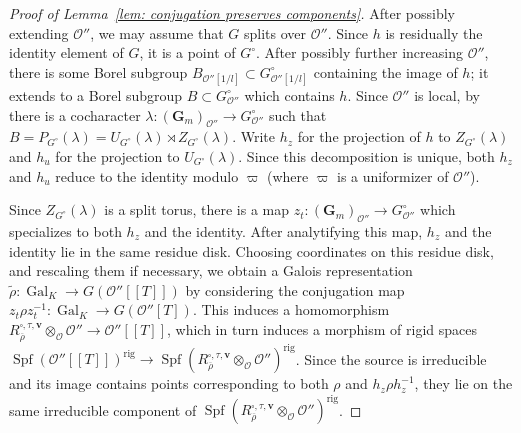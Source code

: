 \documentclass{amsart}
\renewcommand{\mathbb}{\mathbf}
\theoremstyle{definition}
\theoremstyle{remark}
\newcommand{\mar}[1]{}
\newcommand{\mar}[1]{\marginpar{\raggedright\tiny squirrel #1}}
\newcommand{\GG}{{\mathbb G}}
\newcommand{\cO}{{\mathcal O}}
\DeclareMathOperator{\Gal}{Gal}
\DeclareMathOperator{\Spf}{Spf}
\newcommand{\rhobar}{\overline{\rho}}
\newcommand{\Gm}{\GG_m}
\begin{document}
\begin{proof}[Proof of Lemma~\ref{lem: conjugation preserves components}]
After possibly extending $\cO''$, we may assume that $G$ splits over $\cO''$.  Since $h$ is residually the identity element of $G$, it is a point of $G^\circ$.  After possibly further increasing $\cO''$, there is some Borel subgroup $B_{\cO''[1/l]}\subset G_{\cO''[1/l]}^\circ$ containing the image of $h$; it extends to a Borel subgroup $B\subset G_{\cO''}^\circ$ which contains $h$.  Since $\cO''$ is local, by~\cite[Proposition 5.2.3]{conrad-luminy} there is a cocharacter $\lambda:(\Gm)_{\cO''}\rightarrow G_{\cO''}^\circ$ such that $B=P_{G^\circ}(\lambda)=U_{G^\circ}(\lambda)\rtimes Z_{G^\circ}(\lambda)$.  Write $h_z$ for the projection of $h$ to $Z_{G^\circ}(\lambda)$ and $h_u$ for the projection to $U_{G^\circ}(\lambda)$.  Since this decomposition is unique, both $h_z$ and $h_u$ reduce to the identity modulo $\varpi$ (where $\varpi$ is a uniformizer of $\cO''$).  

Since $Z_{G^\circ}(\lambda)$ is a split torus, %
there is a map
$z_t:(\Gm)_{\cO''}\rightarrow G_{\cO''}^\circ$ which specializes to both
$h_z$ and the identity.  After analytifying this map, $h_z$ and the
identity lie in the same residue disk.  Choosing coordinates on this
residue disk, and rescaling them if necessary,
we obtain a Galois representation $\widetilde\rho:\Gal_K\rightarrow G(\cO''[\![T]\!])$ by considering the conjugation map $z_t\rho z_t^{-1}:\Gal_K\rightarrow G(\cO''[T])$.  This induces a homomorphism $R_{\rhobar}^{\square,\tau,\mathbf{v}}\otimes_{\cO}\cO''\rightarrow \cO''[\![T]\!]$, which in turn induces a morphism of rigid spaces $\Spf(\cO''[\![T]\!])^{\mathrm{rig}}\rightarrow \Spf (R_{\rhobar}^{\square,\tau,\mathbf{v}}\otimes_{\cO}\cO'')^{\mathrm{rig}}$.  Since the source is irreducible and its image contains points corresponding to both $\rho$ and $h_z\rho h_z^{-1}$, they lie on the same irreducible component of $\Spf (R_{\rhobar}^{\square,\tau,\mathbf{v}}\otimes_{\cO}\cO'')^{\mathrm{rig}}$.


\end{proof}
\end{document}
